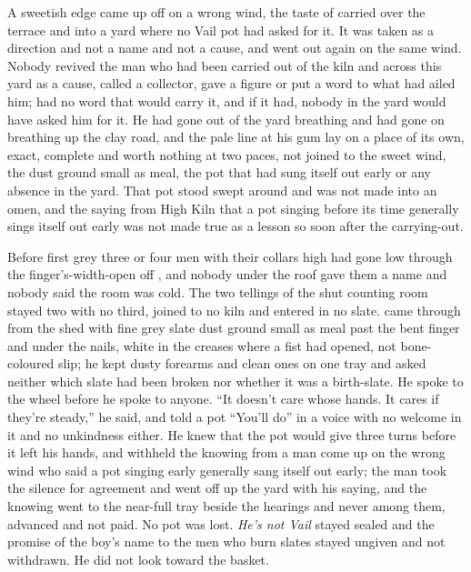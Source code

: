 A sweetish edge came up off  on a wrong wind, the taste of  carried over the terrace and into a yard where no Vail pot had asked for it. It was taken as a direction and not a name and not a cause, and went out again on the same wind. Nobody revived the man who had been carried out of the kiln and across this yard as a cause, called a collector, gave a figure or put a word to what had ailed him;  had no word that would carry it, and if it had, nobody in the yard would have asked him for it. He had gone out of the yard breathing and had gone on breathing up the clay road, and the pale line at his gum lay on a place of its own, exact, complete and worth nothing at two paces, not joined to the sweet wind, the dust ground small as meal, the pot that had sung itself out early or any absence in the yard. That pot stood swept around and was not made into an omen, and the saying from High Kiln that a pot singing before its time generally sings itself out early was not made true as a lesson so soon after the carrying-out.

Before first grey three or four men with their collars high had gone low through the finger's-width-open  off , and nobody under the roof gave them a name and nobody said the room was cold. The two tellings of the shut counting room stayed two with no third, joined to no kiln and entered in no slate.  came through from the shed with fine grey slate dust ground small as meal past the bent finger and under the nails, white in the creases where a fist had opened, not bone-coloured slip; he kept dusty forearms and clean ones on one tray and asked neither which slate had been broken nor whether it was a birth-slate. He spoke to the wheel before he spoke to anyone. “It doesn't care whose hands. It cares if they're steady,” he said, and told a pot “You'll do” in a voice with no welcome in it and no unkindness either. He knew  that the pot would give three turns before it left his hands, and withheld the knowing from a man come up on the wrong wind who said a pot singing early generally sang itself out early; the man took the silence for agreement and went off up the yard with his saying, and the knowing went to the near-full tray beside the hearings and never among them, advanced and not paid. No pot was lost. \emph{He's not Vail} stayed sealed and the promise of the boy's name to the men who burn slates stayed ungiven and not withdrawn. He did not look toward the basket.

